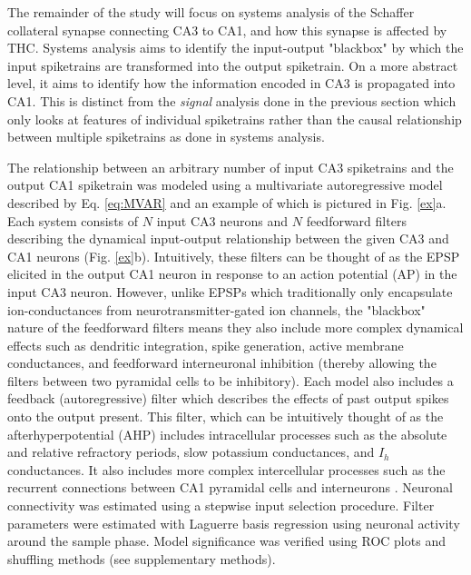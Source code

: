 \documentclass[11pt,a4paper,final]{article}
\begin{document}
The remainder of the study will focus on systems analysis of the Schaffer collateral synapse  connecting CA3 to CA1, and how this synapse is affected by THC.
Systems analysis aims to identify the input-output "blackbox" by which the input spiketrains are transformed into the output spiketrain.
On a more abstract level, it aims to identify how the information encoded in CA3 is propagated into CA1.
This is distinct from the \textit{signal} analysis done in the previous section which only looks at features of individual spiketrains rather than the causal relationship between multiple spiketrains as done in systems analysis.

The relationship between an arbitrary number of input CA3 spiketrains and the output CA1 spiketrain was modeled using a multivariate autoregressive model described by Eq. \ref{eq:MVAR} and an example of which is pictured in Fig. \ref{ex}a.
Each system consists of $N$ input CA3 neurons and $N$ feedforward filters describing the dynamical input-output relationship between the given CA3 and CA1 neurons (Fig. \ref{ex}b). 
Intuitively, these filters can be thought of as the EPSP elicited in the output CA1 neuron in response to an action potential (AP) in the input CA3 neuron.
However, unlike EPSPs which traditionally only encapsulate ion-conductances from neurotransmitter-gated ion channels, the "blackbox" nature of the feedforward filters means they also include more complex dynamical effects such as dendritic integration, spike generation, active membrane conductances, and feedforward interneuronal inhibition (thereby allowing the filters between two pyramidal cells to be inhibitory).
Each model also includes a feedback (autoregressive) filter which describes the effects of past output spikes onto the output present.
This filter, which can be intuitively thought of as the afterhyperpotential (AHP) \citep{spruston07} includes intracellular processes such as the absolute and relative refractory periods, slow potassium conductances, and $I_h$ conductances.
It also includes more complex intercellular processes such as the recurrent connections between CA1 pyramidal cells and interneurons \citep{klausberger08}.
Neuronal connectivity was estimated using a stepwise input selection procedure.
Filter parameters were estimated with Laguerre basis regression using neuronal activity around the sample phase.
Model significance was verified using ROC plots and shuffling methods (see supplementary methods).
\end{document}
